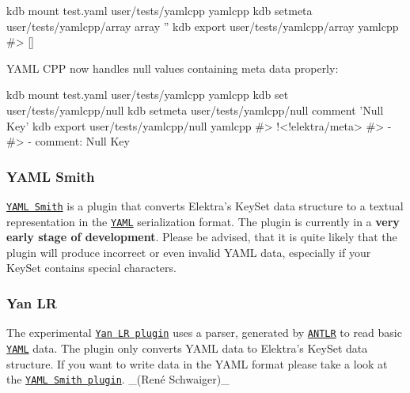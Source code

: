 \begin{DoxyCode}
kdb mount test.yaml user/tests/yamlcpp yamlcpp
kdb setmeta user/tests/yamlcpp/array array ''
kdb export user/tests/yamlcpp/array yamlcpp
#> []
\end{DoxyCode}



\begin{DoxyItemize}
\item Y\+A\+ML C\+PP now handles null values containing meta data properly\+:
\end{DoxyItemize}


\begin{DoxyCode}
kdb mount test.yaml user/tests/yamlcpp yamlcpp
kdb set user/tests/yamlcpp/null
kdb setmeta user/tests/yamlcpp/null comment 'Null Key'
kdb export user/tests/yamlcpp/null yamlcpp
#> !<!elektra/meta>
#> - ~
#> - comment: Null Key
\end{DoxyCode}


\subsubsection*{Y\+A\+ML Smith}


\begin{DoxyItemize}
\item \href{http://libelektra.org/plugins/yamlsmith}{\tt Y\+A\+ML Smith} is a plugin that converts Elektra’s {\ttfamily Key\+Set} data structure to a textual representation in the \href{http://yaml.org}{\tt Y\+A\+ML} serialization format. The plugin is currently in a {\bfseries very early stage of development}. Please be advised, that it is quite likely that the plugin will produce incorrect or even invalid Y\+A\+ML data, especially if your {\ttfamily Key\+Set} contains special characters.
\end{DoxyItemize}

\subsubsection*{Yan LR}


\begin{DoxyItemize}
\item The experimental \href{http://libelektra.org/plugins/yanlr}{\tt Yan LR plugin} uses a parser, generated by \href{http://www.antlr.org}{\tt A\+N\+T\+LR} to read basic \href{http://yaml.org}{\tt Y\+A\+ML} data. The plugin only converts Y\+A\+ML data to Elektra’s {\ttfamily Key\+Set} data structure. If you want to write data in the Y\+A\+ML format please take a look at the \href{http://libelektra.org/plugins/yamlsmith}{\tt Y\+A\+ML Smith plugin}. \+\_\+(René Schwaiger)\+\_\+
\end{DoxyItemize}


